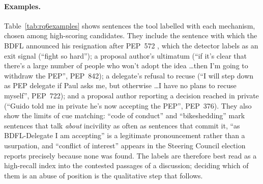 \paragraph{Examples.} Table~\ref{tab:rq6examples} shows sentences the tool labelled with each mechanism, chosen among high-scoring candidates. They include the sentence with which the BDFL announced his resignation after PEP~572 \cite{transferofpower}, which the detector labels as an exit signal (``fight so hard''); a proposal author's ultimatum (``if it's clear that there's a large number of people who won't adopt the idea \ldots then I'm going to withdraw the PEP'', PEP~842); a delegate's refusal to recuse (``I will step down as PEP delegate if Paul asks me, but otherwise \ldots I have no plans to recuse myself'', PEP~722); and a proposal author reporting a decision reached in private (``Guido told me in private he's now accepting the PEP'', PEP~376). They also show the limits of cue matching: ``code of conduct'' and ``bikeshedding'' mark sentences that talk \emph{about} incivility as often as sentences that commit it, ``as BDFL-Delegate I am accepting'' is a legitimate pronouncement rather than a usurpation, and ``conflict of interest'' appears in the Steering Council election reports precisely because none was found. The labels are therefore best read as a high-recall index into the contested passages of a discussion; deciding which of them is an abuse of position is the qualitative step that follows.

